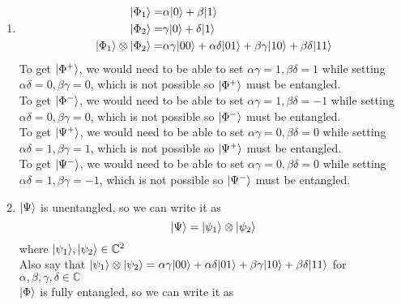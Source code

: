 \documentclass{assignment}
\begin{document}
\begin{problemlist}

  \pbitem
  \begin{problem}
  \end{problem}
  \begin{answer}
    \\
    \begin{enumerate}
    \item
      \begin{align*}
        {\left\vert{\Phi_1}\right\rangle} =& \alpha {\left\vert{0}\right\rangle} + \beta {\left\vert{1}\right\rangle}\\
        {\left\vert{\Phi_2}\right\rangle} =& \gamma {\left\vert{0}\right\rangle} + \delta {\left\vert{1}\right\rangle}\\
        {\left\vert{\Phi_1}\right\rangle} \otimes {\left\vert{\Phi_2}\right\rangle} =& \alpha \gamma {\left\vert{00}\right\rangle} + \alpha \delta {\left\vert{01}\right\rangle} + \beta \gamma {\left\vert{10}\right\rangle} + \beta \delta {\left\vert{11}\right\rangle}\\
      \end{align*}
      To get ${\left\vert{\Phi^+}\right\rangle}$, we would need to be able to set $\alpha\gamma = 1, \beta\delta=1$ while setting $\alpha\delta = 0, \beta\gamma = 0$, which is not possible so ${\left\vert{\Phi^+}\right\rangle}$ must be entangled.\\
      To get ${\left\vert{\Phi^-}\right\rangle}$, we would need to be able to set $\alpha\gamma = 1, \beta\delta=-1$ while setting $\alpha\delta = 0, \beta\gamma = 0$, which is not possible so ${\left\vert{\Phi^-}\right\rangle}$ must be entangled.\\
      To get ${\left\vert{\Psi^+}\right\rangle}$, we would need to be able to set $\alpha\gamma = 0, \beta\delta=0$ while setting $\alpha\delta = 1, \beta\gamma = 1$, which is not possible so ${\left\vert{\Psi^+}\right\rangle}$ must be entangled.\\
      To get ${\left\vert{\Psi^-}\right\rangle}$, we would need to be able to set $\alpha\gamma = 0, \beta\delta=0$ while setting $\alpha\delta = 1, \beta\gamma = -1$, which is not possible so ${\left\vert{\Psi^-}\right\rangle}$ must be entangled.\\
    \item
      ${\left\vert{\Psi}\right\rangle}$ is unentangled, so we can write it as
      \begin{equation}
        {\left\vert{\Psi}\right\rangle} = {\left\vert{\psi_1}\right\rangle} \otimes {\left\vert{\psi_2}\right\rangle}
      \end{equation}
      where ${\left\vert{\psi_1}\right\rangle},{\left\vert{\psi_2}\right\rangle}\in \mathbb{C}^2$\\
      Also say that ${\left\vert{\psi_1}\right\rangle} \otimes {\left\vert{\psi_2}\right\rangle} = \alpha \gamma {\left\vert{00}\right\rangle} + \alpha \delta {\left\vert{01}\right\rangle} + \beta \gamma {\left\vert{10}\right\rangle} + \beta \delta {\left\vert{11}\right\rangle}$ for $\alpha,\beta,\gamma,\delta \in \mathbb{C}$\\
      ${\left\vert{\Phi}\right\rangle}$ is fully entangled, so we can write it as

\end{enumerate}
\end{answer}
\end{problemlist}
\end{document}

